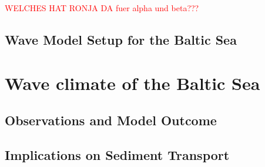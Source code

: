 \textcolor{red}{WELCHES HAT RONJA DA fuer alpha und beta???}

\subsection{Wave Model Setup for the Baltic Sea}

\section{Wave climate of the Baltic Sea}

\subsection{Observations and Model Outcome}

\subsection{Implications on Sediment Transport}